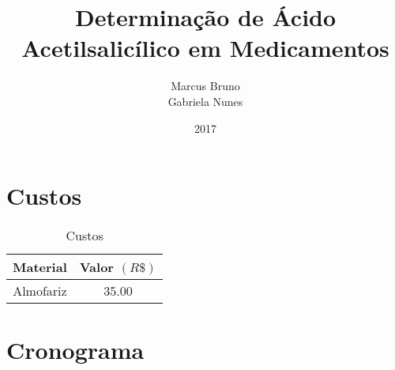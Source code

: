 \documentclass[a4paper,12pt]{article}
\title{Determinação de Ácido Acetilsalicílico em Medicamentos}
\author{Marcus Bruno  \\Gabriela Nunes}
\date{2017}
\begin{document}
    \maketitle
    \newpage
    \tableofcontents
    \newpage

    

     

     \section{Custos} \label{sec:Custos}
     \begin{table}[H]
         \caption{Custos}
     \medskip
         \label{t:custos}
         \centering
         \begin{tabular}{c | c }
             \hline
             \hline
             \textbf{Material} & \textbf{Valor $(R\$)$} \\
             \hline
             Almofariz & 35.00\\
         \end{tabular}
     \end{table}

     

     \section{Cronograma} \label{sec:Cronograma}


     \newpage
     
     
     
\end{document}
